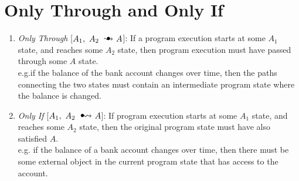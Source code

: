 \documentclass[12pt]{article}
\newcommand{\constrained}{\mathrel{\leadsto\ \!\!\!\!{\raisebox{1pt}{$\mathsmaller{\mathsmaller{\mathsmaller{\mathsmaller\rvert}}}$}}}}
\newcommand\trans{\mathlarger{\mathlarger \leadsto}}
\newcommand\oi{\hspace{1mm}{\raisebox{1pt}{$\bullet$}}\hspace{-1mm}{\trans}}
\newcommand\ot{\hspace{2mm}{\raisebox{1pt}{$\bullet$}}\hspace{-3mm}{\trans}}
\newcommand\gives[3]{\langle #1\ \texttt{gives}\ #2\ \texttt{to}\ #3 \rangle}
\newcommand\onlyIf[3]{#1,\ #2\ \oi\ #3}
\newcommand\onlyThrough[3]{#1,\ #2\ \ot\ #3}
\newcommand\calls[4]{\langle #1\ \texttt{calls}\ #2.#3(#4) \rangle}
\newcommand\access[2]{\langle #1\ \texttt{access}\ #2 \rangle}
\newcommand\internal[1]{\langle #1\ \texttt{internal}\rangle}
\numberwithin{case}{lemma}
\numberwithin{case}{theorem}
\numberwithin{subcase}{case}
\begin{document}
\begin{itemize}
\end{itemize}

\section{Only Through and Only If}

\begin{enumerate}
\item
\emph{Only Through} [$\onlyThrough{A_1}{A_2}{A}$]: If a program execution starts at some $A_1$ state, and reaches some $A_2$ state, then program execution must have passed through some $A$ state.\\
e.g.if the balance of the bank account changes over time, then the paths connecting the two states must contain 
an intermediate program state where the balance is changed.
\item
\emph{Only If} [$\onlyIf{A_1}{A_2}{A}$]: If program execution starts at some $A_1$ state, and reaches some $A_2$ state, 
then the original program state must have also satisfied $A$.\\
e.g. if the balance of a bank account changes over time, then there must be some external object in the current 
program state that has access to the account.
\end{enumerate}
\end{document}
